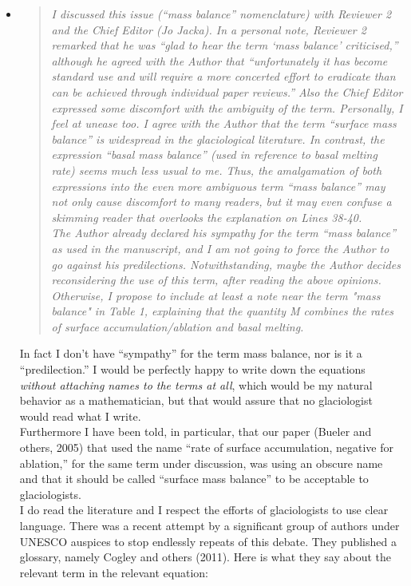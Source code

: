 \documentclass[11pt,reqno]{amsart}
\newcommand{\reply}[2]{
\medskip\medskip
\item  \begin{quote}
\emph{#1}
\end{quote}

\medskip
\noindent #2}
\begin{document}
\begin{itemize}
\reply{I discussed this issue (``mass balance'' nomenclature) with Reviewer 2 and the Chief Editor (Jo Jacka). In a personal note, Reviewer 2 remarked that he was ``glad to hear the term `mass balance' criticised,'' although he agreed with the Author that ``unfortunately it has become standard use and will require a more concerted effort to eradicate than can be achieved through individual paper reviews.''  Also the Chief Editor expressed some discomfort with the ambiguity of the term.  Personally, I feel at unease too.  I agree with the Author that the term ``surface mass balance'' is widespread in the glaciological literature.  In contrast, the expression ``basal mass balance'' (used in reference to basal melting rate) seems much less usual to me.  Thus, the amalgamation of both expressions into the even more ambiguous term ``mass balance'' may not only cause discomfort to many readers, but it may even confuse a skimming reader that overlooks the explanation on Lines 38-40.
\medskip \\
The Author already declared his sympathy for the term ``mass balance'' as used in the manuscript, and I am not going to force the Author to go against his predilections. Notwithstanding, maybe the Author decides reconsidering the use of this term, after reading the above opinions. Otherwise, I propose to include at least a note near the term "mass balance" in Table 1, explaining that the quantity M combines the rates of surface accumulation/ablation and basal melting.}
{In fact I don't have ``sympathy'' for the term mass balance, nor is it a ``predilection.''  I would be perfectly happy to write down the equations \emph{without attaching names to the terms at all}, which would be my natural behavior as a mathematician, but that would assure that no glaciologist would read what I write.
\medskip \\
Furthermore I have been told, in particular, that our paper (Bueler and others, 2005) that used the name ``rate of surface accumulation, negative for ablation,'' for the same term under discussion, was using an obscure name and that it should be called ``surface mass balance'' to be acceptable to glaciologists.
\medskip \\
I do read the literature and I respect the efforts of glaciologists to use clear language.  There was a recent attempt by a significant group of authors under UNESCO auspices to stop endlessly repeats of this debate.  They published a glossary, namely Cogley and others (2011).  Here is what they say about the relevant term in the relevant equation: \\
}
\end{itemize}
\end{document}
